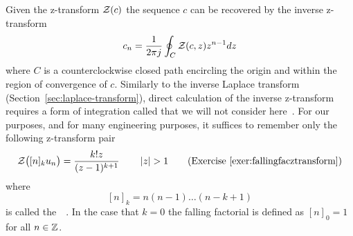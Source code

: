 \newcommand{\stirling}[2]{\genfrac{[}{]}{0pt}{}{#1}{#2}}
\newcommand{\eulerian}[2]{\genfrac{\langle}{\rangle}{0pt}{}{#1}{#2}}

Given the z-transform ${\mathcal Z}(c)$ the sequence $c$ can be recovered by the inverse z-transform
\[
c_n = \frac{1}{2\pi j} \oint_C {\mathcal Z}(c,z) z^{n-1} dz
\]
where $C$ is a counterclockwise closed path encircling the origin and within the region of convergence of $c$.  Similarly to the inverse Laplace transform (Section~\ref{sec:laplace-transform}), direct calculation of the inverse z-transform requires a form of integration called  that we will not consider here~\citep{Stewart_ComplexAnalysis_2004}.  For our purposes, and for many engineering purposes, it suffices to remember only the following z-transform pair 
\[
{\mathcal Z}\big( [n]_k u_n \big) = \frac{k! z }{(z - 1)^{k+1}} \qquad \left\vert z \right\vert > 1 \qquad \text{(Exercise~\ref{exer:fallingfacztransform})}
\]
where
\[
[n]_k = n (n-1) \dots (n-k+1)
\]
is called the~~\cite[p. 48]{concretemath_1994}.  In the case that $k=0$ the falling factorial is defined as $[n]_0 = 1$ for all $n\in{\mathbb Z}$.  

